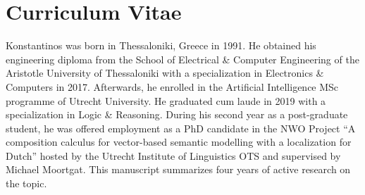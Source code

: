 \chapter*{Curriculum Vitae}
Konstantinos was born in Thessaloniki, Greece in 1991.
He obtained his engineering diploma from the School of Electrical \& Computer Engineering of the Aristotle University of Thessaloniki with a specialization in Electronics \& Computers in 2017.
Afterwards, he enrolled in the Artificial Intelligence MSc programme of Utrecht University. 
He graduated cum laude in 2019 with a specialization in Logic \& Reasoning.
During his second year as a post-graduate student, he was offered employment as a PhD candidate in the NWO Project ``A composition calculus for vector-based semantic modelling with a localization for Dutch'' hosted by the Utrecht Institute of Linguistics OTS and supervised by Michael Moortgat.
This manuscript summarizes four years of active research on the topic.
